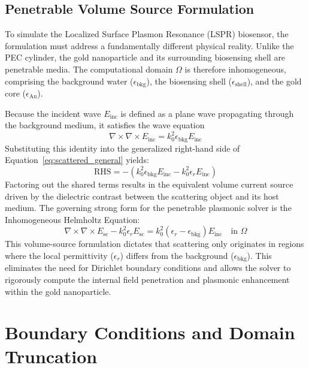 \subsection{Penetrable Volume Source Formulation}

To simulate the Localized Surface Plasmon Resonance (LSPR) biosensor, the formulation must address a fundamentally different physical reality. Unlike the PEC cylinder, the gold nanoparticle and its surrounding biosensing shell are penetrable media. The computational domain $\Omega$ is therefore inhomogeneous, comprising the background water ($\epsilon_{\text{bkg}}$), the biosensing shell ($\epsilon_{\text{shell}}$), and the gold core ($\epsilon_{\text{Au}}$).

\vspace{0.5em}

Because the incident wave $E_{\text{inc}}$ is defined as a plane wave propagating through the background medium, it satisfies the wave equation
\begin{equation}
\nabla \times \nabla \times E_{\text{inc}} = k_0^2 \epsilon_{\text{bkg}} E_{\text{inc}}
\end{equation}
Substituting this identity into the generalized right-hand side of Equation~\ref{eq:scattered_general} yields:
\begin{equation}
\text{RHS} = -\left(k_0^2 \epsilon_{\text{bkg}} E_{\text{inc}} - k_0^2 \epsilon_r E_{\text{inc}}\right)
\label{eq:rhs_penetrable}
\end{equation}
Factoring out the shared terms results in the equivalent volume current source driven by the dielectric contrast between the scattering object and its host medium. The governing strong form for the penetrable plasmonic solver is the Inhomogeneous Helmholtz Equation:
\begin{equation}
\nabla \times \nabla \times E_{\text{sc}} - k_0^2 \epsilon_r E_{\text{sc}} = k_0^2 \left(\epsilon_r - \epsilon_{\text{bkg}}\right) E_{\text{inc}} \quad \text{in } \Omega
\label{eq:penetrable_helmholtz}
\end{equation}
This volume-source formulation dictates that scattering only originates in regions where the local permittivity ($\epsilon_r$) differs from the background ($\epsilon_{\text{bkg}}$). This eliminates the need for Dirichlet boundary conditions and allows the solver to rigorously compute the internal field penetration and plasmonic enhancement within the gold nanoparticle.

\section{Boundary Conditions and Domain Truncation}

